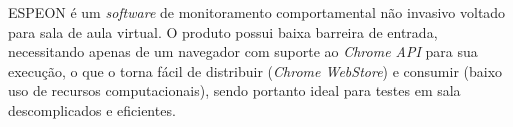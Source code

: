 ESPEON é um \textit{software} de monitoramento comportamental não invasivo voltado para sala de aula virtual. O produto possui baixa barreira de entrada, necessitando apenas de um navegador com suporte ao \textit{Chrome API} para sua execução, o que o torna fácil de distribuir (\textit{Chrome WebStore}) e consumir (baixo uso de recursos computacionais), sendo portanto ideal para testes em sala descomplicados e eficientes.
